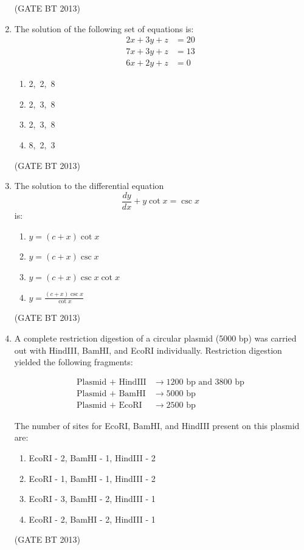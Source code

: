 \documentclass[journal,12pt,onecolumn]{IEEEtran}
\theoremstyle{remark}
\begin{document}
\begin{enumerate}
\begin{enumerate}
\end{enumerate} \hfill(GATE BT 2013)

\item 

The solution of the following set of equations is:
\[
\begin{aligned}
2x + 3y + z &= 20 \\
7x + 3y + z &= 13 \\
6x + 2y + z &= 0
\end{aligned}
\]

\begin{enumerate}[label=(\Alph*)]
    \item 2,\ 2,\ 8
    \item 2,\ 3,\ 8
    \item 2,\ 3,\ 8
    \item 8,\ 2,\ 3
\end{enumerate} \hfill(GATE BT 2013)

\item 

The solution to the differential equation 
\[
\frac{dy}{dx} + y \cot x = \csc x
\]
is:

\begin{enumerate}[label=(\Alph*)]
    \item \( y = (c + x) \cot x \)
    \item \( y = (c + x) \csc x \)
    \item \( y = (c + x) \csc x \cot x \)
    \item \( y = \frac{(c + x) \csc x}{\cot x} \)
\end{enumerate} \hfill(GATE BT 2013)

\item 

A complete restriction digestion of a circular plasmid (5000 bp) was carried out with HindIII, BamHI, and EcoRI individually. Restriction digestion yielded the following fragments:

\[
\begin{aligned}
\text{Plasmid + HindIII} &\to 1200 \text{ bp and } 3800 \text{ bp} \\
\text{Plasmid + BamHI} &\to 5000 \text{ bp} \\
\text{Plasmid + EcoRI} &\to 2500 \text{ bp}
\end{aligned}
\]

The number of sites for EcoRI, BamHI, and HindIII present on this plasmid are:

\begin{enumerate}[label=(\Alph*)]
    \item EcoRI - 2, BamHI - 1, HindIII - 2
    \item EcoRI - 1, BamHI - 1, HindIII - 2
    \item EcoRI - 3, BamHI - 2, HindIII - 1
    \item EcoRI - 2, BamHI - 2, HindIII - 1
\end{enumerate} \hfill(GATE BT 2013)


\end{enumerate}
\end{document}
